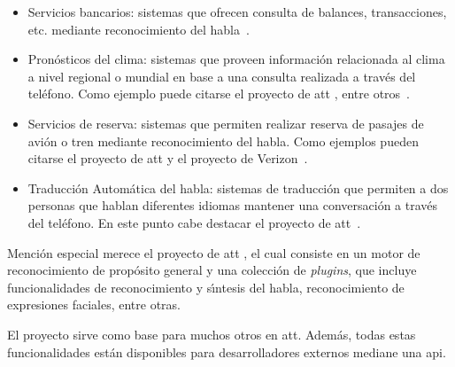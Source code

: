 \begin{itemize}
	\item Servicios bancarios: sistemas que ofrecen consulta de balances, transacciones, etc. mediante
	reconocimiento del \mbox{habla \cite{PreeEnhancing1999}}.

	\item Pron\'osticos del clima: sistemas que proveen informaci\'on relacionada al clima a nivel
	regional o mundial en base a una consulta realizada a trav\'es del tel\'efono. Como ejemplo puede
	citarse el proyecto  de \gls{att} \cite{ZueJupiter2000}, entre \mbox{otros \cite{ZibertBiliengual2003}}.

	\item Servicios de reserva: sistemas que permiten realizar reserva de pasajes de avi\'on o tren 
	mediante reconocimiento del habla. Como ejemplos pueden citarse el proyecto  
	de \gls{att} \cite{Seneff2000Dialogue} y el proyecto  de 
	\mbox{Verizon \cite{StallardEvaluation2001}}.

	\item Traducci\'on Autom\'atica del habla: sistemas de traducci\'on que permiten a dos personas 
	que hablan diferentes idiomas mantener una conversaci\'on a trav\'es del tel\'efono. 
	En este punto cabe destacar el proyecto  de \mbox{\gls{att} \cite{Rangarajan2012}}.
\end{itemize}

Menci\'on especial merece el proyecto  de \gls{att} \cite{AttWatson}, el cual consiste en 
un motor de reconocimiento de prop\'osito general y una colecci\'on de \emph{plugins}, que incluye 
funcionalidades de reconocimiento y s{\'\i}ntesis del habla, reconocimiento de expresiones faciales, 
entre otras. 

El proyecto  sirve como base para muchos otros en \gls{att}. 
Adem\'as, todas estas funcionalidades est\'an disponibles para desarrolladores externos mediane una \gls{api}. 
